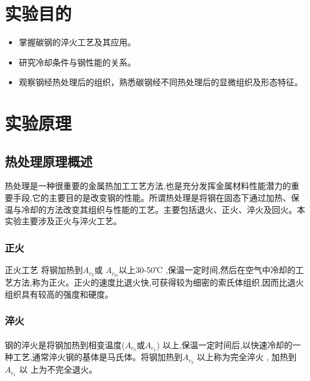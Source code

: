 \documentclass[12pt]{ctexart}
\begin{document}
\author{陈俊铭、段云智、何阳阳、黄梓煊、卢延昭、陆子良、宣筠铮\\（以姓名拼音排序）}


\newpage
\thispagestyle{empty}
\tableofcontents
\newpage
\setcounter{page}{1}
\section{实验目的}
\begin{itemize}
\item 掌握碳钢的淬火工艺及其应用。
\item 研究冷却条件与钢性能的关系。
\item 观察钢经热处理后的组织，熟悉碳钢经不同热处理后的显微组织及形态特征。
\end{itemize}
\section{实验原理}
\subsection{热处理原理概述}
热处理是一种很重要的金属热加工工艺方法,也是充分发挥金属材料性能潜力的重要手段,它的主要目的是改变钢的性能。所谓热处理是将钢在固态下通过加热、保温与冷却的方法改变其组织与性能的工艺。主要包括退火、正火、淬火及回火。本实验主要涉及正火与淬火工艺。
\subsubsection{正火}
正火工艺 将钢加热到${A_{{c_3}}}$或 ${A_{{c_m}}}$以上30-50℃ ,保温一定时间,然后在空气中冷却的工艺方法,称为正火。正火的速度比退火快,可获得较为细密的索氏体组织,因而比退火组织具有较高的强度和硬度。
\subsubsection{淬火}
\paragraph{}
 钢的淬火是将钢加热到相变温度(${A_{{c_3}}}$或${A_{{c_1}}}$) 以上,保温一定时间后,以快速冷却的一种工艺,通常淬火钢的基体是马氏体。将钢加热到${A_{{c_3}}}$ 以上称为完全淬火 , 加热到${A_{{c_1}}}$ 以 上为不完全退火。
\end{document}

